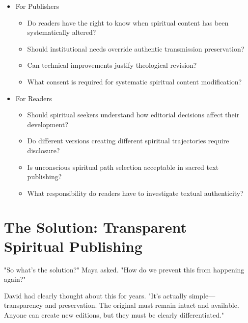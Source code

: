 \documentclass[11pt,twoside]{book}
\begin{document}
\begin{itemize}
\item For Publishers
\label{sec:orgf03f105}
\begin{itemize}
\item Do readers have the right to know when spiritual content has been systematically altered?
\item Should institutional needs override authentic transmission preservation?
\item Can technical improvements justify theological revision?
\item What consent is required for systematic spiritual content modification?
\end{itemize}
\item For Readers
\label{sec:org77df08a}
\begin{itemize}
\item Should spiritual seekers understand how editorial decisions affect their development?
\item Do different versions creating different spiritual trajectories require disclosure?
\item Is unconscious spiritual path selection acceptable in sacred text publishing?
\item What responsibility do readers have to investigate textual authenticity?
\end{itemize}
\end{itemize}
\section*{The Solution: Transparent Spiritual Publishing}
\label{sec:org8bd7648}

"So what's the solution?" Maya asked. "How do we prevent this from happening again?"

David had clearly thought about this for years. "It's actually simple—transparency and preservation. The original must remain intact and available. Anyone can create new editions, but they must be clearly differentiated."
\end{document}
